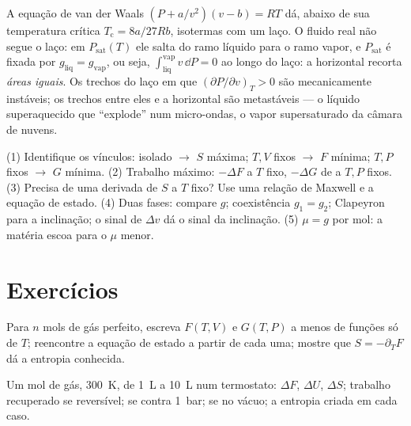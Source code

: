 \begin{remark}\label{rem:b2:thermodynamic-potentials:maxwellconstruction}
A equação de van der Waals $(P + a/v^2)(v - b) = RT$ dá, abaixo de sua
temperatura crítica $T_{\text{c}} = 8a/27Rb$, isotermas com um laço. O
fluido real não segue o laço: em $P_{\text{sat}}(T)$ ele salta do
ramo líquido para o ramo vapor, e $P_{\text{sat}}$ é fixada por $g_{\text{liq}}
= g_{\text{vap}}$, ou seja, $\int_{\text{liq}}^{\text{vap}}v\,\dd P = 0$ ao longo do
laço: a horizontal recorta \emph{áreas iguais}. Os trechos do
laço em que $(\partial P/\partial v)_T > 0$ são mecanicamente instáveis; os
trechos entre eles e a horizontal são metastáveis --- o líquido
superaquecido que ``explode'' num micro-ondas, o vapor supersaturado da
câmara de nuvens.
\end{remark}

\begin{method}\label{meth:b2:thermodynamic-potentials:method}
(1) Identifique os vínculos: isolado $\to$ $S$ máxima; $T,V$ fixos $\to$
$F$ mínima; $T,P$ fixos $\to$ $G$ mínima. (2) Trabalho máximo: $-\Delta F$ a $T$
fixo, $-\Delta G$ de  a $T,P$ fixos. (3) Precisa de uma derivada de
$S$ a $T$ fixo? Use uma relação de Maxwell e a equação de estado.
(4) Duas fases: compare $g$; coexistência $g_1 = g_2$; Clapeyron para a
inclinação; o sinal de $\Delta v$ dá o sinal da inclinação. (5)  $\mu = g$ por mol: a matéria escoa para o $\mu$ menor.
\end{method}

\section{Exercícios}

\begin{exercise}[$\star$]\label{exo:b2:thermodynamic-potentials:1}
Para $n$ mols de gás perfeito, escreva $F(T,V)$ e $G(T,P)$ a menos de
funções só de $T$; reencontre a equação de estado a partir de cada uma; mostre
que $S = -\partial_TF$ dá a entropia conhecida.
\end{exercise}

\begin{exercise}[$\star$]\label{exo:b2:thermodynamic-potentials:2}
Um mol de gás, \qty{300}{K}, de \qty{1}{L} a \qty{10}{L} num
termostato: $\Delta F$, $\Delta U$, $\Delta S$; trabalho recuperado se reversível;
se contra \qty{1}{bar}; se no vácuo; a entropia criada em cada
caso.
\end{exercise}

